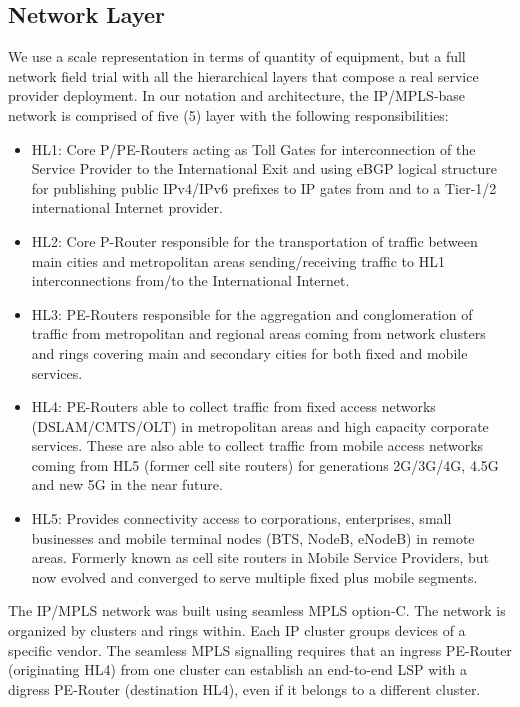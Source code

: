 \documentclass[a4paper,fleqn]{cas-dc}
\begin{document}
\subsection{Network Layer}
\label{sec:netlay}
We use a scale representation in terms of quantity of equipment, but a full network field trial with all the hierarchical layers that compose a real service provider deployment. In our notation and architecture, the IP/MPLS-base network is comprised of five (5) layer with the following responsibilities: 
\begin{itemize}
    \item HL1: Core P/PE-Routers acting as Toll Gates for interconnection of the Service Provider to the International Exit and using eBGP logical structure for publishing public IPv4/IPv6 prefixes to IP gates from and to a Tier-1/2 international Internet provider.
    \item HL2: Core P-Router responsible for the transportation of traffic between main cities and metropolitan areas sending/receiving traffic to HL1 interconnections from/to the International Internet.
    \item HL3: PE-Routers responsible for the aggregation and conglomeration of traffic from metropolitan and regional areas coming from network clusters and rings covering main and secondary cities for both fixed and mobile services.
    \item HL4: PE-Routers able to collect traffic from fixed access networks (DSLAM/CMTS/OLT) in metropolitan areas and high capacity corporate services. These are also able to collect traffic from mobile access networks coming from HL5 (former cell site routers) for generations 2G/3G/4G, 4.5G and new 5G in the near future.
    \item HL5: Provides connectivity access to corporations, enterprises, small businesses and mobile terminal nodes (BTS, NodeB, eNodeB) in remote areas. Formerly known as cell site routers in Mobile Service Providers, but now evolved and converged to serve multiple fixed plus mobile segments.     
\end{itemize}

The IP/MPLS network was built using seamless MPLS option-C. The network is organized by clusters and rings within. Each IP cluster groups devices of a specific vendor. The seamless MPLS signalling requires that an ingress PE-Router (originating HL4) from one cluster can establish an end-to-end LSP with a digress PE-Router (destination HL4), even if it belongs to a different cluster.
\end{document}
